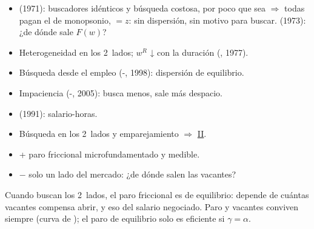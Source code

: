 \documentclass{article}
\begin{document}
\begin{columnas}
\begin{itemize}
  \begin{itemize}
  \item duración esperada del paro: $1/[1-F(w^R)]$;
  \item $w^R$ (y la duración) ↑ con ↑$z$, ↑$\beta$ (paciencia) y ↑dispersión (la opción de esperar vale más); $\partial w^R/\partial z\in(0,1)$;
  \item frente al $w^R$ estático : +  $\Rightarrow$ $w^R>z$; sin nuevas ofertas, $w^R=z$ ;
  \item paro \emph{friccional} y \emph{elegido} $\Rightarrow$ \emph{voluntario}. Islas de - (1974).
  \end{itemize}
\item {} (1971): buscadores idénticos y búsqueda costosa, por poco que sea $\Rightarrow$ todas pagan el de monopsonio, $=z$: sin dispersión, sin motivo para buscar.  (1973): ¿de dónde sale $F(w)$?
\end{itemize}
\begin{itemize}
\item Heterogeneidad en los 2~lados; $w^R$ ↓ con la duración (, 1977).
\item Búsqueda desde el empleo (-, 1998): dispersión de equilibrio.
\item Impaciencia (-, 2005): busca menos, sale más despacio.
\item {} (1991):  salario-horas.
\item Búsqueda en los 2~lados y emparejamiento $\Rightarrow$ \hyperref[rep:II]{II}.
\end{itemize}
\begin{itemize}
\item + paro friccional microfundamentado y medible.
\item $-$ solo un lado del mercado: ¿de dónde salen las vacantes?
\end{itemize}

\begin{ideaclave}
Cuando buscan los 2~lados, el paro friccional es de equilibrio: depende de cuántas vacantes compensa abrir, y eso del salario negociado. Paro y vacantes conviven siempre (curva de ); el paro de equilibrio solo es eficiente si $\gamma=\alpha$.
\end{ideaclave}


\end{columnas}
\end{document}
